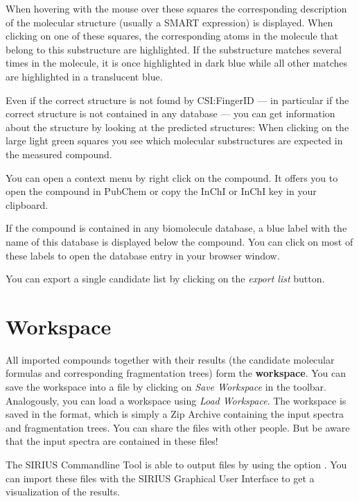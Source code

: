 \documentclass[letterpaper,10pt,openany,oneside]{sphinxmanual}
\newcommand\gui[1]{\textsl{\guilsinglleft#1\guilsinglright\xspace}}
\begin{document}
When hovering with the mouse over these squares the corresponding description of the molecular structure (usually a SMART expression) is displayed. When clicking on one of these squares, the corresponding atoms in the molecule that belong to this substructure are highlighted. If the substructure matches several times in the molecule, it is once highlighted in dark blue while all other matches are highlighted in a translucent blue.

Even if the correct structure is not found by CSI:FingerID --- in particular
if the correct structure is not contained in any database --- you can get
information about the structure by looking at the predicted structures: When
clicking on the large light green squares you see which molecular
substructures are expected in the measured compound.

You can open a context menu by right click on the compound. It offers you to open the compound in PubChem or copy the InChI or InChI key in your clipboard.

If the compound is contained in any biomolecule database, a blue label with the name of this database is displayed below the compound. You can click on most of these labels to open the database entry in your browser window.

You can export a single candidate list by clicking on the \gui{export list} button.



\section{Workspace}
\label{gui:workspace}

All imported compounds together with their results (the candidate molecular formulas and corresponding fragmentation trees) form the \textbf{workspace}. You can save the workspace into a file by clicking on \gui{Save Workspace} in the toolbar. Analogously, you can load a workspace using \gui{Load Workspace}. The workspace is saved in the  format, which is simply a Zip Archive containing the input spectra and fragmentation trees. You can share the  files with other people. But be aware that the input spectra are contained in these files!

The SIRIUS Commandline Tool is able to output  files by using the option . You can import these files with the SIRIUS Graphical User Interface to get a visualization of the results.
\end{document}
